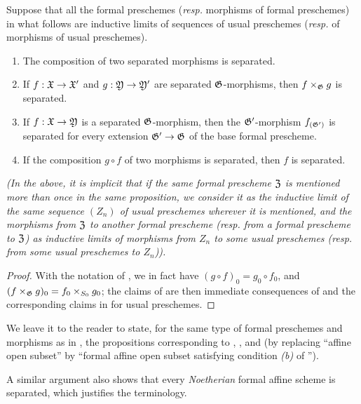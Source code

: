 \begin{prop}[10.15.3]
\label{1.10.15.3}
Suppose that all the formal preschemes (\emph{resp.} morphisms of formal preschemes) in what follows are inductive limits of sequences of usual preschemes (\emph{resp.} of morphisms of usual preschemes).
\begin{enumerate}[label=\emph{(\roman*)}]
    \item The composition of two separated morphisms is separated.
    \item If $f:\fk{X}\to\fk{X}'$ and $g:\fk{Y}\to\fk{Y}'$ are separated $\mathfrak{G}$-morphisms, then $f\times_\mathfrak{G}g$ is separated.
    \item If $f:\fk{X}\to\fk{Y}$ is a separated $\mathfrak{G}$-morphism, then the $\mathfrak{G}'$-morphism $f_{(\mathfrak{G}')}$ is separated for every extension $\fk{G}'\to\fk{G}$ of the base formal prescheme.
    \item If the composition $g\circ f$ of two morphisms is separated, then $f$ is separated.
\end{enumerate}
\emph{(In the above, it is implicit that if the same formal prescheme $\mathfrak{Z}$ is mentioned more than once in the same proposition, we consider it as the inductive limit of the \emph{same} sequence $(Z_n)$ of usual preschemes wherever it is mentioned, and the morphisms from $\mathfrak{Z}$ to another formal prescheme (resp. from a formal prescheme to $\mathfrak{Z}$) as inductive limits of morphisms from $Z_n$ to some usual preschemes (resp. from some usual preschemes to $Z_n$)).}
\end{prop}

\begin{proof}
\label{proof-1.10.15.3}
With the notation of , we in fact have $(g\circ f)_0=g_0\circ f_0$, and $(f\times_\mathfrak{G}g)_0=f_0\times_{S_0}g_0$;
the claims of  are then immediate consequences of  and the corresponding claims in  for usual preschemes.
\end{proof}

We leave it to the reader to state, for the same type of formal preschemes and morphisms as in , the propositions corresponding to , , and  (by replacing ``affine open subset'' by ``formal affine open subset satisfying condition \emph{(b)} of '').

A similar argument also shows that every \emph{Noetherian} formal affine scheme is separated, which justifies the terminology.

